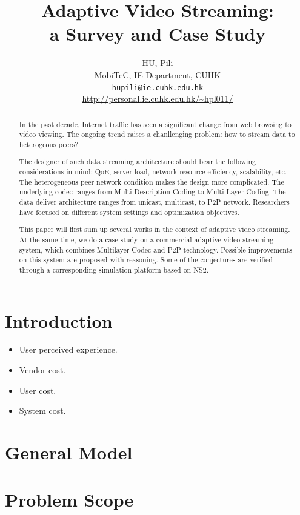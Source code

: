 \documentclass[11pt,a4paper]{article}
\author{HU, Pili \\
MobiTeC, IE Department, CUHK \\
\texttt{hupili@ie.cuhk.edu.hk} \\
\url{http://personal.ie.cuhk.edu.hk/~hpl011/} 
}
\title{Adaptive Video Streaming: 
 \\ a Survey and Case Study}
\begin{document}
\maketitle

\begin{abstract}
	In the past decade, Internet traffic has seen a significant 
	change from web browsing to video viewing. The ongoing trend 
	raises a chanllenging problem: how to stream data to heterogeous 
	peers? 
	
	The designer of such data streaming architecture should 
	bear the following considerations in mind: QoE, server load, 
	network resource efficiency, scalability, etc. The heterogeneous 
	peer network condition makes the design more complicated. The 
	underlying codec ranges from Multi Description Coding to Multi 
	Layer Coding. The data deliver architecture ranges from unicast,
	multicast, to P2P network. Researchers have focused on different 
	system settings and optimization objectives. 
	 
	This paper will first
	sum up several works in the context of adaptive video streaming. 
	At the same time, we do a case study on a commercial adaptive 
	video streaming system, which combines Multilayer Codec and P2P 
	technology. Possible improvements on this system are proposed
	with reasoning. Some of the conjectures are
	verified through a corresponding simulation platform based on NS2. 
\end{abstract}

\pagebreak
\tableofcontents
\pagebreak

\section{Introduction}



\begin{itemize}
	\item User perceived experience. 
	\item Vendor cost. 
	\item User cost. 
	\item System cost. 
\end{itemize}

\section{General Model}


\section{Problem Scope}
\end{document}
